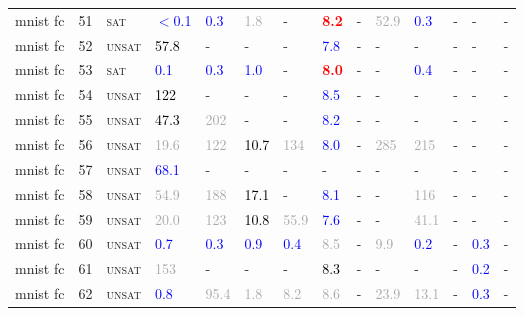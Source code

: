 \begin{center}
{\begin{longtable}{@{}llllllllllllll@{}}
mnist fc & 51 & \textsc{sat} & \textcolor{blue}{$<$0.1} & \textcolor{blue}{0.3} & \textcolor{darkgray}{1.8} & - & \textbf{\textcolor{red}{8.2}} & - & \textcolor{darkgray}{52.9} & \textcolor{blue}{0.3} & - & - & - \\
mnist fc & 52 & \textsc{unsat} & \textcolor{black}{57.8} & - & - & - & \textcolor{blue}{7.8} & - & - & - & - & - & - \\
mnist fc & 53 & \textsc{sat} & \textcolor{blue}{0.1} & \textcolor{blue}{0.3} & \textcolor{blue}{1.0} & - & \textbf{\textcolor{red}{8.0}} & - & - & \textcolor{blue}{0.4} & - & - & - \\
mnist fc & 54 & \textsc{unsat} & \textcolor{black}{122} & - & - & - & \textcolor{blue}{8.5} & - & - & - & - & - & - \\
mnist fc & 55 & \textsc{unsat} & \textcolor{black}{47.3} & \textcolor{darkgray}{202} & - & - & \textcolor{blue}{8.2} & - & - & - & - & - & - \\
mnist fc & 56 & \textsc{unsat} & \textcolor{darkgray}{19.6} & \textcolor{darkgray}{122} & \textcolor{black}{10.7} & \textcolor{darkgray}{134} & \textcolor{blue}{8.0} & - & \textcolor{darkgray}{285} & \textcolor{darkgray}{215} & - & - & - \\
mnist fc & 57 & \textsc{unsat} & \textcolor{blue}{68.1} & - & - & - & - & - & - & - & - & - & - \\
mnist fc & 58 & \textsc{unsat} & \textcolor{darkgray}{54.9} & \textcolor{darkgray}{188} & \textcolor{black}{17.1} & - & \textcolor{blue}{8.1} & - & - & \textcolor{darkgray}{116} & - & - & - \\
mnist fc & 59 & \textsc{unsat} & \textcolor{darkgray}{20.0} & \textcolor{darkgray}{123} & \textcolor{black}{10.8} & \textcolor{darkgray}{55.9} & \textcolor{blue}{7.6} & - & - & \textcolor{darkgray}{41.1} & - & - & - \\
mnist fc & 60 & \textsc{unsat} & \textcolor{blue}{0.7} & \textcolor{blue}{0.3} & \textcolor{blue}{0.9} & \textcolor{blue}{0.4} & \textcolor{darkgray}{8.5} & - & \textcolor{darkgray}{9.9} & \textcolor{blue}{0.2} & - & \textcolor{blue}{0.3} & - \\
mnist fc & 61 & \textsc{unsat} & \textcolor{darkgray}{153} & - & - & - & \textcolor{black}{8.3} & - & - & - & - & \textcolor{blue}{0.2} & - \\
mnist fc & 62 & \textsc{unsat} & \textcolor{blue}{0.8} & \textcolor{darkgray}{95.4} & \textcolor{darkgray}{1.8} & \textcolor{darkgray}{8.2} & \textcolor{darkgray}{8.6} & - & \textcolor{darkgray}{23.9} & \textcolor{darkgray}{13.1} & - & \textcolor{blue}{0.3} & - \\

\end{longtable}}
\end{center}
